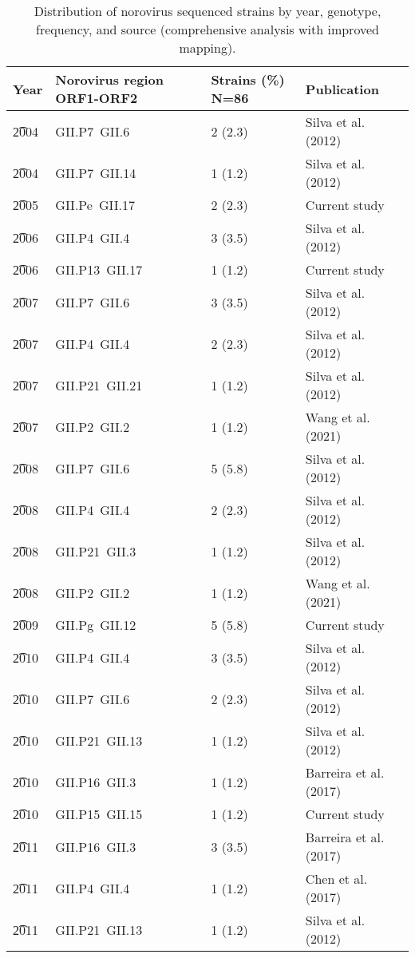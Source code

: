 \begin{table}[htbp]
	\centering
	\caption{Distribution of norovirus sequenced strains by year, genotype, frequency, and source (comprehensive analysis with improved mapping).}
	\scriptsize
	\begin{tabular}{p{0.6cm}p{3.2cm}p{1.8cm}p{2.5cm}}
		\toprule
		\textbf{Year} & \textbf{Norovirus region ORF1-ORF2} & \textbf{Strains (\%) N=86} & \textbf{Publication} \\
		\midrule
\t	2004 & GII.P7~GII.6 & 2 (2.3) & Silva et al. (2012) \\
\t	2004 & GII.P7~GII.14 & 1 (1.2) & Silva et al. (2012) \\
\t	2005 & GII.Pe~GII.17 & 2 (2.3) & Current study \\
\t	2006 & GII.P4~GII.4 & 3 (3.5) & Silva et al. (2012) \\
\t	2006 & GII.P13~GII.17 & 1 (1.2) & Current study \\
\t	2007 & GII.P7~GII.6 & 3 (3.5) & Silva et al. (2012) \\
\t	2007 & GII.P4~GII.4 & 2 (2.3) & Silva et al. (2012) \\
\t	2007 & GII.P21~GII.21 & 1 (1.2) & Silva et al. (2012) \\
\t	2007 & GII.P2~GII.2 & 1 (1.2) & Wang et al. (2021) \\
\t	2008 & GII.P7~GII.6 & 5 (5.8) & Silva et al. (2012) \\
\t	2008 & GII.P4~GII.4 & 2 (2.3) & Silva et al. (2012) \\
\t	2008 & GII.P21~GII.3 & 1 (1.2) & Silva et al. (2012) \\
\t	2008 & GII.P2~GII.2 & 1 (1.2) & Wang et al. (2021) \\
\t	2009 & GII.Pg~GII.12 & 5 (5.8) & Current study \\
\t	2010 & GII.P4~GII.4 & 3 (3.5) & Silva et al. (2012) \\
\t	2010 & GII.P7~GII.6 & 2 (2.3) & Silva et al. (2012) \\
\t	2010 & GII.P21~GII.13 & 1 (1.2) & Silva et al. (2012) \\
\t	2010 & GII.P16~GII.3 & 1 (1.2) & Barreira et al. (2017) \\
\t	2010 & GII.P15~GII.15 & 1 (1.2) & Current study \\
\t	2011 & GII.P16~GII.3 & 3 (3.5) & Barreira et al. (2017) \\
\t	2011 & GII.P4~GII.4 & 1 (1.2) & Chen et al. (2017) \\
\t	2011 & GII.P21~GII.13 & 1 (1.2) & Silva et al. (2012) \\

\end{tabular}
\end{table}
